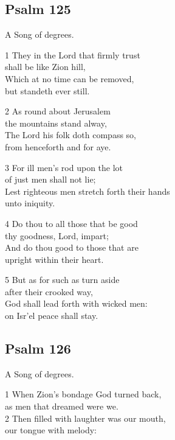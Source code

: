 \begin{multicols}{3}
\begin{center}
\quad{}\quad{}
\end{center}

\subsection*{Psalm 125}

A Song of degrees.

1 They in the Lord that firmly trust\\
shall be like Zion hill,\\
Which at no time can be removed,\\
but standeth ever still.

2 As round about Jerusalem\\
the mountains stand alway,\\
The Lord his folk doth compass so,\\
from henceforth and for aye.

3 For ill men’s rod upon the lot\\
of just men shall not lie;\\
Lest righteous men stretch forth their hands\\
unto iniquity.

4 Do thou to all those that be good\\
thy goodness, Lord, impart;\\
And do thou good to those that are\\
upright within their heart.

5 But as for such as turn aside\\
after their crooked way,\\
God shall lead forth with wicked men:\\
on Isr’el peace shall stay.

\begin{center}
\quad{}\quad{}
\end{center}

\subsection*{Psalm 126}

A Song of degrees.

1 When Zion’s bondage God turned back,\\
as men that dreamed were we.\\
2 Then filled with laughter was our mouth,\\
our tongue with melody:


\end{multicols}
